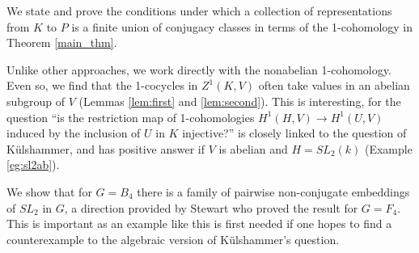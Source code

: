 \documentclass[a4paper, 11pt, oneside]{Thesis}  %
\begin{document}
{We state and prove the conditions under which a collection of representations from $K$ to $P$ is a finite union of conjugacy classes in terms of the 1-cohomology in Theorem \ref{main_thm}.

Unlike other approaches, we work directly with the nonabelian 1-cohomology. Even so, we find that the 1-cocycles in $Z^1(K, V)$ often take values in an abelian subgroup of $V$ (Lemmas \ref{lem:first} and \ref{lem:second}). This is interesting, for the question ``is the restriction map of 1-cohomologies $H^1(H, V) \rightarrow H^1(U, V)$ induced by the inclusion of $U$ in $K$ injective?'' is closely linked to the question of K\"ulshammer, and has positive answer if $V$ is abelian and $H=SL_2(k)$ (Example \ref{eg:sl2ab}).

We show that for $G=B_4$ there is a family of pairwise non-conjugate embeddings of $SL_2$ in $G$, a direction provided by Stewart who proved the result for $G=F_4$. This is important as an example like this is first needed if one hopes to find a counterexample to the algebraic version of K\"ulshammer's question.

}

\clearpage  %


\clearpage  %
\pagestyle{fancy}  %


\tableofcontents  %
\end{document}
